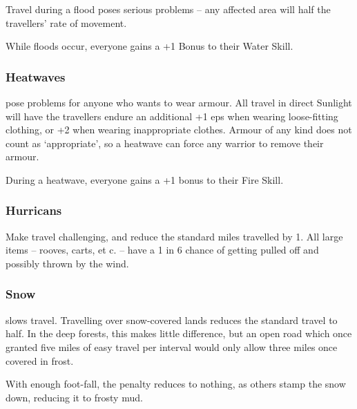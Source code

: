 \begin{multicols}{2}
Travel during a flood poses serious problems -- any affected area will half the travellers' rate of movement.

While floods occur, everyone gains a +1 Bonus to their Water Skill.

\subsubsection{Heatwaves}
pose problems for anyone who wants to wear armour.
All travel in direct Sunlight will have the travellers endure an additional +1 \glspl{ep} when wearing loose-fitting clothing, or +2 when wearing inappropriate clothes.
Armour of any kind does not count as `appropriate', so a heatwave can force any warrior to remove their armour.

During a heatwave, everyone gains a +1 bonus to their Fire Skill.

\subsubsection{Hurricans}
Make travel challenging, and reduce the standard miles travelled by 1.
All large items -- rooves, carts, et c. -- have a 1 in 6 chance of getting pulled off and possibly thrown by the wind.

\subsubsection{Snow}
slows travel.
Travelling over snow-covered lands reduces the standard travel to half.
In the deep forests, this makes little difference, but an open road which once granted five miles of easy travel per \gls{interval} would only allow three miles once covered in frost.

With enough foot-fall, the penalty reduces to nothing, as others stamp the snow down, reducing it to frosty mud.

\end{multicols}

\setcounter{diceNo}{13}
\setcounter{diceNo2}{15}
\setcounter{enc}{17}

